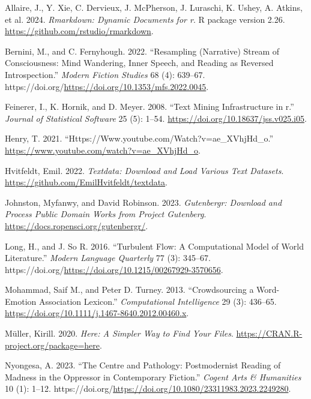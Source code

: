 \documentclass[
  letterpaper,
  DIV=11,
  numbers=noendperiod]{scrartcl}
\newlength{\cslhangindent}
\newenvironment{CSLReferences}[2] %
 {\begin{list}{}{%
  \setlength{\itemindent}{0pt}
  \setlength{\leftmargin}{0pt}
  \setlength{\parsep}{0pt}
  \ifodd #1
   \setlength{\leftmargin}{\cslhangindent}
   \setlength{\itemindent}{-1\cslhangindent}
  \fi
  \setlength{\itemsep}{#2\baselineskip}}}
 {\end{list}}
\begin{document}
\label{refs}
\begin{CSLReferences}{1}{0}
Allaire, J., Y. Xie, C. Dervieux, J. McPherson, J. Luraschi, K. Ushey,
A. Atkins, et al. 2024. \emph{Rmarkdown: Dynamic Documents for r}. R
package version 2.26. \url{https://github.com/rstudio/rmarkdown}.

Bernini, M., and C. Fernyhough. 2022. {``Resampling (Narrative) Stream
of Consciousness: Mind Wandering, Inner Speech, and Reading as Reversed
Introspection.''} \emph{Modern Fiction Studies} 68 (4): 639--67.
https://doi.org/\url{https://doi.org/10.1353/mfs.2022.0045}.

Feinerer, I., K. Hornik, and D. Meyer. 2008. {``Text Mining
Infrastructure in r.''} \emph{Journal of Statistical Software} 25 (5):
1--54. \url{https://doi.org/10.18637/jss.v025.i05}.

Henry, T. 2021. {``Https://Www.youtube.com/Watch?v=ae\_XVhjHd\_o.''}
\url{https://www.youtube.com/watch?v=ae_XVhjHd_o}.

Hvitfeldt, Emil. 2022. \emph{Textdata: Download and Load Various Text
Datasets}. \url{https://github.com/EmilHvitfeldt/textdata}.

Johnston, Myfanwy, and David Robinson. 2023. \emph{Gutenbergr: Download
and Process Public Domain Works from Project Gutenberg}.
\url{https://docs.ropensci.org/gutenbergr/}.

Long, H., and J. So R. 2016. {``Turbulent Flow: A Computational Model of
World Literature.''} \emph{Modern Language Quarterly} 77 (3): 345--67.
https://doi.org/\url{https://doi.org/10.1215/00267929-3570656}.

Mohammad, Saif M., and Peter D. Turney. 2013. {``Crowdsourcing a
Word-Emotion Association Lexicon.''} \emph{Computational Intelligence}
29 (3): 436--65. \url{https://doi.org/10.1111/j.1467-8640.2012.00460.x}.

Müller, Kirill. 2020. \emph{Here: A Simpler Way to Find Your Files}.
\url{https://CRAN.R-project.org/package=here}.

Nyongesa, A. 2023. {``The Centre and Pathology: Postmodernist Reading of
Madness in the Oppressor in Contemporary Fiction.''} \emph{Cogent Arts
\& Humanities} 10 (1): 1--12.
https://doi.org/\url{https://doi.org/10.1080/23311983.2023.2249280}.


\end{CSLReferences}
\end{document}
